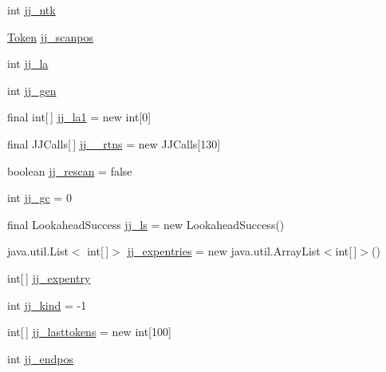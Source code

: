\begin{DoxyCompactItemize}
\item 
int \hyperlink{classorg_1_1coode_1_1owlapi_1_1functionalparser_1_1_o_w_l_functional_syntax_parser_ac796edaad971a994e83d6dd07191f5d5}{jj\-\_\-ntk}
\item 
\hyperlink{classorg_1_1coode_1_1owlapi_1_1functionalparser_1_1_token}{Token} \hyperlink{classorg_1_1coode_1_1owlapi_1_1functionalparser_1_1_o_w_l_functional_syntax_parser_ab8b4f45a3a68c6f5ea09c0dd95af98c5}{jj\-\_\-scanpos}
\item 
int \hyperlink{classorg_1_1coode_1_1owlapi_1_1functionalparser_1_1_o_w_l_functional_syntax_parser_aad2ca4dff93049efcded2f45499ebb93}{jj\-\_\-la}
\item 
int \hyperlink{classorg_1_1coode_1_1owlapi_1_1functionalparser_1_1_o_w_l_functional_syntax_parser_ad302592183f15baaed74a216c0f5d577}{jj\-\_\-gen}
\item 
final int\mbox{[}$\,$\mbox{]} \hyperlink{classorg_1_1coode_1_1owlapi_1_1functionalparser_1_1_o_w_l_functional_syntax_parser_a08f8917609e360d155539d8ec2edcf41}{jj\-\_\-la1} = new int\mbox{[}0\mbox{]}
\item 
final J\-J\-Calls\mbox{[}$\,$\mbox{]} \hyperlink{classorg_1_1coode_1_1owlapi_1_1functionalparser_1_1_o_w_l_functional_syntax_parser_a901d1998d2b3c3b64211a24e4f5b81d6}{jj\-\_\-\_\-rtns} = new J\-J\-Calls\mbox{[}130\mbox{]}
\item 
boolean \hyperlink{classorg_1_1coode_1_1owlapi_1_1functionalparser_1_1_o_w_l_functional_syntax_parser_a1a05e79f378048ed923557712b8b5d81}{jj\-\_\-rescan} = false
\item 
int \hyperlink{classorg_1_1coode_1_1owlapi_1_1functionalparser_1_1_o_w_l_functional_syntax_parser_abb0fd86cb140ae43841f2ef309652eab}{jj\-\_\-gc} = 0
\item 
final Lookahead\-Success \hyperlink{classorg_1_1coode_1_1owlapi_1_1functionalparser_1_1_o_w_l_functional_syntax_parser_a123b0e354d38e3714288f1d25cd7fdea}{jj\-\_\-ls} = new Lookahead\-Success()
\item 
java.\-util.\-List$<$ int\mbox{[}$\,$\mbox{]}$>$ \hyperlink{classorg_1_1coode_1_1owlapi_1_1functionalparser_1_1_o_w_l_functional_syntax_parser_acc76686b0c814bfdadf244b9bf746f87}{jj\-\_\-expentries} = new java.\-util.\-Array\-List$<$int\mbox{[}$\,$\mbox{]}$>$()
\item 
int\mbox{[}$\,$\mbox{]} \hyperlink{classorg_1_1coode_1_1owlapi_1_1functionalparser_1_1_o_w_l_functional_syntax_parser_aa8a22a6a486fd84e9d143269313e7cf9}{jj\-\_\-expentry}
\item 
int \hyperlink{classorg_1_1coode_1_1owlapi_1_1functionalparser_1_1_o_w_l_functional_syntax_parser_a8631af0e2afd870c3bac018fcd75026c}{jj\-\_\-kind} = -\/1
\item 
int\mbox{[}$\,$\mbox{]} \hyperlink{classorg_1_1coode_1_1owlapi_1_1functionalparser_1_1_o_w_l_functional_syntax_parser_a046e77ff3116bdb40b7fb2eedf9fa00a}{jj\-\_\-lasttokens} = new int\mbox{[}100\mbox{]}
\item 
int \hyperlink{classorg_1_1coode_1_1owlapi_1_1functionalparser_1_1_o_w_l_functional_syntax_parser_a7fcce31699f3182d1d5a290d9c83885f}{jj\-\_\-endpos}
\end{DoxyCompactItemize}
